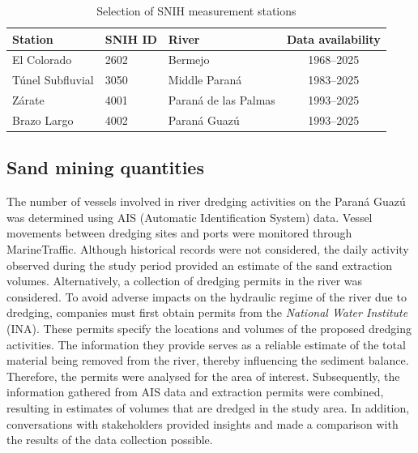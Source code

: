 \begin{table}[H]
    \centering
    \renewcommand{\arraystretch}{1.2} %
    \setlength{\tabcolsep}{8pt}       %
    \caption{Selection of SNIH measurement stations}
    \begin{tabular}{lllc}
        \toprule
        Station & SNIH ID & River & Data availability \\
        \midrule
        El Colorado         & 2602 & Bermejo               & 1968--2025 \\
        Túnel Subfluvial    & 3050 & Middle Paraná         & 1983--2025 \\
        Zárate              & 4001 & Paraná de las Palmas  & 1993--2025 \\
        Brazo Largo         & 4002 & Paraná Guazú          & 1993--2025 \\
        \bottomrule
    \end{tabular}
    
    \label{tab:stations data collection}
\end{table}

\subsection{Sand mining quantities}
The number of vessels involved in river dredging activities on the Paraná Guazú was determined using AIS (Automatic Identification System) data. Vessel movements between dredging sites and ports were monitored through MarineTraffic. Although historical records were not considered, the daily activity observed during the study period provided an estimate of the sand extraction volumes. Alternatively, a collection of dredging permits in the river was considered. To avoid adverse impacts on the hydraulic regime of the river due to dredging, companies must first obtain permits from the \textit{National Water Institute} (INA). These permits specify the locations and volumes of the proposed dredging activities. The information they provide serves as a reliable estimate of the total material being removed from the river, thereby influencing the sediment balance. Therefore, the permits were analysed for the area of interest.
Subsequently, the information gathered from AIS data and extraction permits were combined, resulting in estimates of volumes that are dredged in the study area. In addition, conversations with stakeholders provided insights and made a comparison with the results of the data collection possible.

